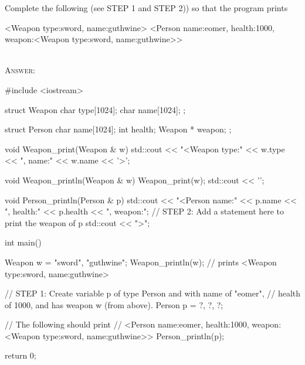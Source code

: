 \nextq
Complete the following (see STEP 1 and STEP 2))
so that the program prints
\begin{console}[fontsize=\footnotesize]
<Weapon type:sword, name:guthwine>
<Person name:eomer, health:1000, weapon:<Weapon type:sword, name:guthwine>>
\end{console}
\\
\textsc{Answer:}\vspace{-2mm}
\begin{answercode}
#include <iostream>

struct Weapon
{
    char type[1024];
    char name[1024];
};

struct Person
{
    char name[1024];
    int health;
    Weapon * weapon;
};

void Weapon_print(Weapon & w)
{
    std::cout << "<Weapon type:" << w.type << ", name:" << w.name << '>';
}

void Weapon_println(Weapon & w)
{
    Weapon_print(w);
    std::cout << '\n';
}

void Person_println(Person & p)
{
    std::cout << "<Person name:" << p.name
              << ", health:" << p.health
              << ", weapon:";
    // STEP 2: Add a statement here to print the weapon of p
    std::cout << ">\n";
}

int main()
{
    Weapon w = {"sword", "guthwine"};
    Weapon_println(w); // prints <Weapon type:sword, name:guthwine>
    
    // STEP 1: Create variable p of type Person and with name of "eomer",
    // health of 1000, and has weapon w (from above).
    Person p = {?, ?, ?};

    // The following should print
    // <Person name:eomer, health:1000, weapon:<Weapon type:sword, name:guthwine>>
    Person_println(p);

    return 0;
}
\end{answercode}


\newpage


